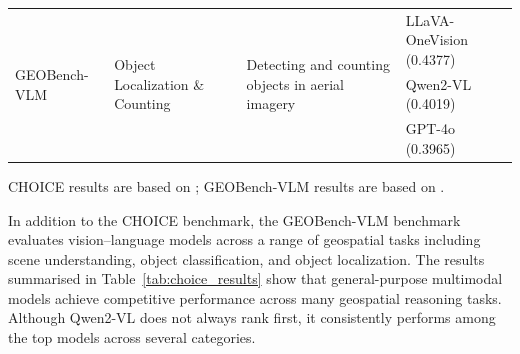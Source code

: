 \begin{table}[htb]
\begin{tabularx}{\textwidth}{
p{}
p{}
X
p{}
}
\midrule

\multirow{3}{=}{GEOBench-VLM}
& \multirow{3}{=}{Object Localization \& Counting}
& \multirow{3}{=}{Detecting and counting objects in aerial imagery}
& LLaVA-OneVision (0.4377) \\
& & & Qwen2-VL (0.4019) \\
& & & GPT-4o (0.3965) \\

\bottomrule
\end{tabularx}

\vspace{0.3em}
\raggedright
\scriptsize
CHOICE results are based on \citet{an2025choicebenchmarkingremotesensing}; GEOBench-VLM results are based on \citet{danish2025geobenchvlmbenchmarkingvisionlanguagemodels}.
\end{table}



In addition to the CHOICE benchmark, the GEOBench-VLM benchmark \citep{danish2025geobenchvlmbenchmarkingvisionlanguagemodels} evaluates vision–language models across a range of geospatial tasks including scene understanding, object classification, and object localization. The results summarised in Table~\ref{tab:choice_results} show that general-purpose multimodal models achieve competitive performance across many geospatial reasoning tasks. Although Qwen2-VL does not always rank first, it consistently performs among the top models across several categories.

